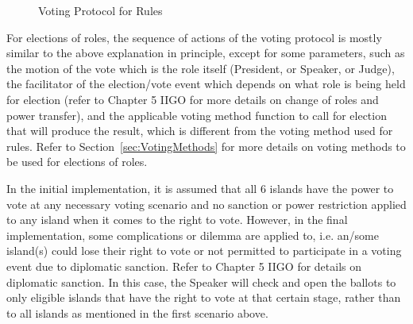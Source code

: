 \begin{figure}[H]
\begin{center}
\caption{Voting Protocol for Rules}
\label{fig:RONRVotingProtocol}
\end{center}
\end{figure}

For elections of roles, the sequence of actions of the voting protocol is mostly similar to the above explanation in principle, except for some parameters, such as the motion of the vote which is the role itself (President, or Speaker, or Judge), the facilitator of the election/vote event which depends on what role is being held for election (refer to Chapter 5 IIGO for more details on change of roles and power transfer), and the applicable voting method function to call for election that will produce the result, which is different from the voting method used for rules. Refer to Section~\ref{sec:VotingMethods} for more details on voting methods to be used for elections of roles.

In the initial implementation, it is assumed that all 6 islands have the power to vote at any necessary voting scenario and no sanction or power restriction applied to any island when it comes to the right to vote. However, in the final implementation, some complications or dilemma are applied to, i.e. an/some island(s) could lose their right to vote or not permitted to participate in a voting event due to diplomatic sanction. Refer to Chapter 5 IIGO for details on diplomatic sanction. In this case, the Speaker will check and open the ballots to only eligible islands that have the right to vote at that certain stage, rather than to all islands as mentioned in the first scenario above.

